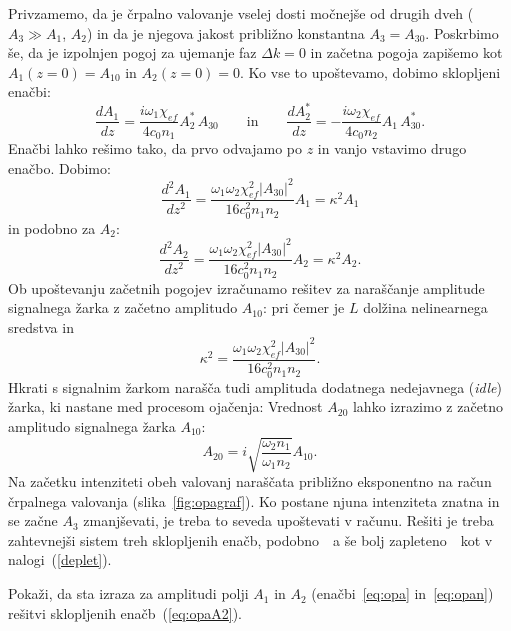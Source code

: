 Privzamemo, da je črpalno valovanje vselej dosti močnejše od drugih dveh
($A_{3}\gg A_{1}$, $A_{2}$) in da je njegova jakost približno konstantna $A_3 = A_{30}$.
Poskrbimo še, da je izpolnjen pogoj za ujemanje faz $\Delta k=0$ in
začetna pogoja zapišemo kot $A_{1}(z=0)=A_{10}$ in $A_{2}(z=0)=0$. Ko vse to upoštevamo,
dobimo sklopljeni enačbi:
\begin{equation}
\frac{dA_{1}}{dz} = \frac{i\omega_{1}\chi_{ef}}{4c_0 n_1} A_{2}^*\, A_{30} 
\qquad \mathrm{in} \qquad
\frac{dA_{2}^*}{dz} = -\frac{i\omega_{2}\chi_{ef}}{4c_0 n_2} A_{1}\, A_{30}^*.
\label{eq:opaA2}
\end{equation}
Enačbi lahko rešimo tako, da prvo odvajamo po $z$ in vanjo vstavimo drugo enačbo.
Dobimo:
\begin{equation}
\frac{d^2 A_1}{d z^2} = \frac{\omega_1 \omega_2 \chi_{ef}^2|A_{30}|^2}
{16 c_0^2 n_1 n_2} A_1 = \kappa^2 A_1
\end{equation}
in podobno za $A_2$:
\begin{equation}
\frac{d^2 A_2}{d z^2} = \frac{\omega_1 \omega_2 \chi_{ef}^2|A_{30}|^2}
{16 c_0^2 n_1 n_2} A_2 = \kappa^2 A_2.
\end{equation}
Ob upoštevanju začetnih pogojev izračunamo rešitev za naraščanje amplitude signalnega žarka
z začetno amplitudo $A_{10}$:
pri čemer je $L$ dolžina nelinearnega sredstva in 
\begin{equation}
\kappa^2 = \frac{\omega_1 \omega_2 \chi_{ef}^2|A_{30}|^2}
{16 c_0^2 n_1 n_2}.
\label{opakapa}
\end{equation}
Hkrati s signalnim žarkom narašča tudi amplituda dodatnega nedejavnega 
({\it idle}) žarka, ki nastane med procesom ojačenja:
Vrednost $A_{20}$ lahko izrazimo z začetno amplitudo signalnega žarka $A_{10}$:
\begin{equation}
A_{20} = i \sqrt{\frac{\omega_2 n_1}{\omega_1 n_2}} A_{10}.
\label{opakapaA}
\end{equation}
Na začetku intenziteti obeh valovanj naraščata približno eksponentno na račun črpalnega
valovanja (slika~\ref{fig:opagraf}). Ko postane njuna intenziteta znatna in se 
začne $A_3$ zmanjševati, je treba to seveda
upoštevati v računu. Rešiti je treba zahtevnejši sistem treh 
sklopljenih enačb, podobno~\textendash~a še bolj zapleteno~\textendash~kot v nalogi~(\ref{deplet}).
\begin{naloga}
Pokaži, da sta izraza za amplitudi polji $A_1$ in $A_2$ (enačbi~\ref{eq:opa} in~\ref{eq:opan})
rešitvi sklopljenih enačb~(\ref{eq:opaA2}).
\end{naloga}

